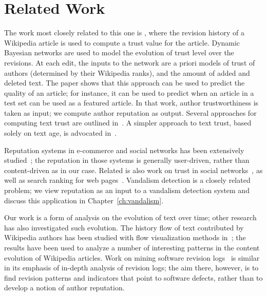 \section{Related Work}

The work most closely related to this one is \cite{Zeng2006}, where the
revision history of a Wikipedia article is used to compute a trust
value for the article.
Dynamic Bayesian networks are used to model the
evolution of trust level over the revisions.
At each edit, the inputs to the network are a priori models of
trust of authors (determined by their Wikipedia ranks),
and the amount of added and deleted text.
The paper shows that this approach can be used to predict the quality
of an article; for instance, it can be used to predict when an article
in a test set can be used as a featured article.
In that work, author trustworthiness is
taken as input; we compute author reputation as output.
Several approaches for computing text trust are outlined
in~\cite{WikiMTWtrust06}.
A simpler approach to text trust, based solely on text age, is
advocated in~\cite{Cross2006}.

Reputation systems in e-commerce and social networks has been extensively
studied~\cite{Resnick2000,Dellarocas2003,Kamvar2003,Farmer2010};
the reputation in those systems is generally user-driven, rather than
content-driven as in our case.
Related is also work on trust in social networks~\cite{Guha2004,Golbeck2005},
as well as search ranking for web pages~\cite{Kleinberg1999,Page1999}.
Vandalism detection is a closely related problem; we view reputation
as an input to a vandalism detection system and discuss this application
in Chapter~\ref{ch:vandalism}.

Our work is a form of analysis on the evolution of text over time;
other research has also investigated such evolution.
The history flow of text contributed by Wikipedia authors has
been studied with flow visualization methods in~\cite{Viegas2004};
the results have been used to analyze a number of interesting patterns
in the content evolution of Wikipedia articles.
Work on mining software revision logs~\cite{Livshits2005}
is similar in its emphasis of in-depth analysis of revision logs; the
aim there, however, is to find revision patterns and indicators that point
to software defects, rather than to develop a notion of author
reputation.


